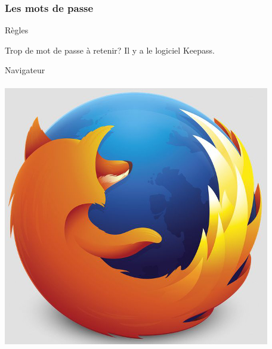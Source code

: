 \documentclass{beamer}
\begin{document}
\begin{frame}
\frametitle{Les mots de passe}
\begin{block}{Règles}
\begin{itemize}
\end{itemize}
\end{block}
\begin{block}{Trop de mot de passe à retenir?}
Il y a le logiciel Keepass.
\end{block}

\end{frame}

\begin{frame}
\begin{center}
\Huge{Navigateur}\\~\\
\includegraphics[scale=0.3] {./images/firefox.jpg}
\end{center}
\end{frame}
\end{document}
